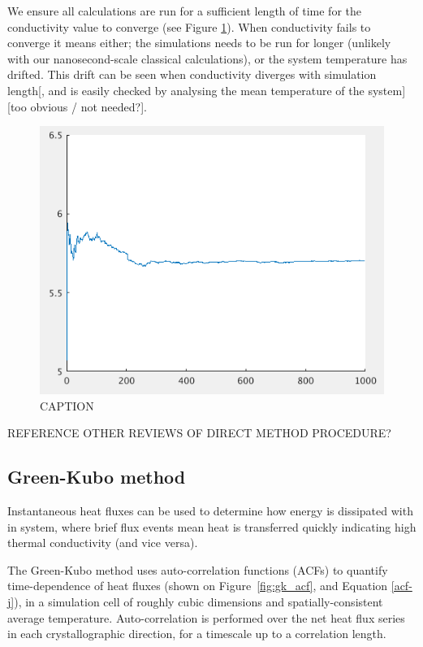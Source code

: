 \documentclass[%
preprint,                                  %
nofootinbib,
 amsmath,amssymb,
 aps,
]{revtex4-1}
\begin{document}
We ensure all calculations are run for a sufficient length of time for the conductivity value to converge (see Figure \ref{fig:kappa_conv}). When conductivity fails to converge it means either; the simulations needs to be run for longer (unlikely with our nanosecond-scale classical calculations), or the system temperature has drifted. This drift can be seen when conductivity diverges with simulation length[, and is easily checked by analysing the mean temperature of the system][too obvious / not needed?].


\begin{figure}[h!]
  \includegraphics[width=\linewidth]{images/kappa_conv.png}
  \caption{CAPTION}
  \label{fig:kappa_conv}
\end{figure}

REFERENCE OTHER REVIEWS OF DIRECT METHOD PROCEDURE?



\subsection{\label{sec:method.gk}Green-Kubo method}

Instantaneous heat fluxes can be used to determine how energy is dissipated with in system, where brief flux events mean heat is transferred quickly indicating high thermal conductivity (and vice versa).

The Green-Kubo method uses auto-correlation functions (ACFs) to quantify time-dependence of heat fluxes (shown on Figure~\ref{fig:gk_acf}, and Equation \ref{acf-j}), in a simulation cell of roughly cubic dimensions and spatially-consistent average temperature. Auto-correlation is performed over the net heat flux series in each crystallographic direction, for a timescale up to a correlation length.
\end{document}

